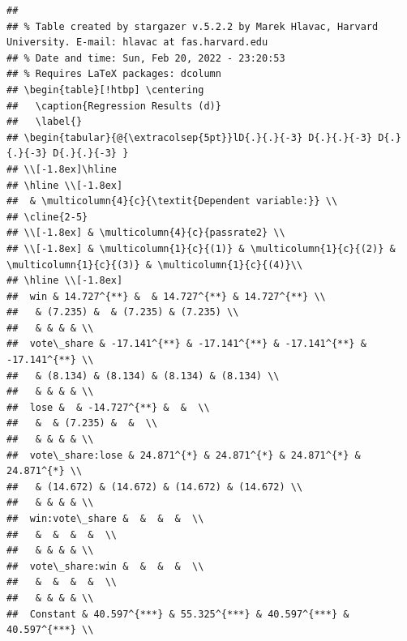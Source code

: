 \documentclass[
  12pt,
  landscape]{article}
\begin{document}
\begin{verbatim}
## 
## % Table created by stargazer v.5.2.2 by Marek Hlavac, Harvard University. E-mail: hlavac at fas.harvard.edu
## % Date and time: Sun, Feb 20, 2022 - 23:20:53
## % Requires LaTeX packages: dcolumn 
## \begin{table}[!htbp] \centering 
##   \caption{Regression Results (d)} 
##   \label{} 
## \begin{tabular}{@{\extracolsep{5pt}}lD{.}{.}{-3} D{.}{.}{-3} D{.}{.}{-3} D{.}{.}{-3} } 
## \\[-1.8ex]\hline 
## \hline \\[-1.8ex] 
##  & \multicolumn{4}{c}{\textit{Dependent variable:}} \\ 
## \cline{2-5} 
## \\[-1.8ex] & \multicolumn{4}{c}{passrate2} \\ 
## \\[-1.8ex] & \multicolumn{1}{c}{(1)} & \multicolumn{1}{c}{(2)} & \multicolumn{1}{c}{(3)} & \multicolumn{1}{c}{(4)}\\ 
## \hline \\[-1.8ex] 
##  win & 14.727^{**} &  & 14.727^{**} & 14.727^{**} \\ 
##   & (7.235) &  & (7.235) & (7.235) \\ 
##   & & & & \\ 
##  vote\_share & -17.141^{**} & -17.141^{**} & -17.141^{**} & -17.141^{**} \\ 
##   & (8.134) & (8.134) & (8.134) & (8.134) \\ 
##   & & & & \\ 
##  lose &  & -14.727^{**} &  &  \\ 
##   &  & (7.235) &  &  \\ 
##   & & & & \\ 
##  vote\_share:lose & 24.871^{*} & 24.871^{*} & 24.871^{*} & 24.871^{*} \\ 
##   & (14.672) & (14.672) & (14.672) & (14.672) \\ 
##   & & & & \\ 
##  win:vote\_share &  &  &  &  \\ 
##   &  &  &  &  \\ 
##   & & & & \\ 
##  vote\_share:win &  &  &  &  \\ 
##   &  &  &  &  \\ 
##   & & & & \\ 
##  Constant & 40.597^{***} & 55.325^{***} & 40.597^{***} & 40.597^{***} \\ 

\end{verbatim}
\end{document}
